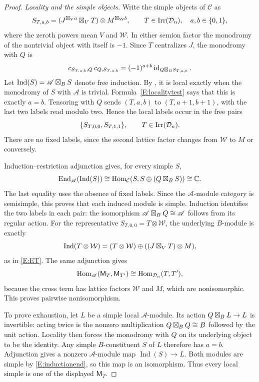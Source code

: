 \documentclass[11pt]{article}
\newcommand{\C}{\mathbb C}\newcommand{\Q}{\mathbb Q}\newcommand{\Z}{\mathbb Z}
\newcommand{\Hom}{\operatorname{Hom}}\newcommand{\id}{\operatorname{id}}
\numberwithin{equation}{section}
\begin{document}
\begin{proof}
\emph{Locality and the simple objects.} Write the simple objects of $\mathcal C$ as
\[
S_{T,a,b}=(J^{\boxtimes_V a}\boxtimes_V T)\otimes M^{\boxtimes_{\mathcal W}b},
\qquad T\in\operatorname{Irr}(\mathcal D_n),\quad a,b\in\{0,1\},
\]
where the zeroth powers mean $V$ and $\mathcal W$. In either semion factor the monodromy of the nontrivial object with itself is $-1$. Since $T$ centralizes $J$, the monodromy with $Q$ is
\begin{equation}\label{E:localitytest}
c_{S_{T,a,b},Q}\,c_{Q,S_{T,a,b}}
=(-1)^{a+b}\id_{Q\bo_B S_{T,a,b}}.
\end{equation}
Let $\operatorname{Ind}(S)=\mathscr A\boxtimes_B S$ denote free induction. By \cite[Proposition~2.65]{E:CKMext}, it is local exactly when the monodromy of $S$ with $\mathscr A$ is trivial. Formula~\eqref{E:localitytest} says that this is exactly $a=b$. Tensoring with $Q$ sends $(T,a,b)$ to $(T,a+1,b+1)$, with the last two labels read modulo two. Hence the local labels occur in the free pairs
\[
\{S_{T,0,0},S_{T,1,1}\},\qquad T\in\operatorname{Irr}(\mathcal D_n).
\]
There are no fixed labels, since the second lattice factor changes from $\mathcal W$ to $M$ or conversely.

Induction--restriction adjunction gives, for every simple $S$,
\begin{equation}\label{E:inductionend}
\End_{\mathscr A}(\operatorname{Ind}(S))
\cong\Hom_{\mathcal C}(S,S\oplus(Q\bo_B S))\cong\C.
\end{equation}
The last equality uses the absence of fixed labels. Since the $\mathscr A$-module category is semisimple, this proves that each induced module is simple. Induction identifies the two labels in each pair: the isomorphism $\mathscr A\boxtimes_B Q\cong\mathscr A$ follows from its regular action. For the representative $S_{T,0,0}=T\otimes\mathcal W$, the underlying $B$-module is exactly
\[
\operatorname{Ind}(T\otimes\mathcal W)
=(T\otimes\mathcal W)\oplus((J\boxtimes_V T)\otimes M),
\]
as in \eqref{E:ET}. The same adjunction gives
\begin{equation}\label{E:inductionhom}
\Hom_{\mathscr A}(\mathsf M_T,\mathsf M_{T'})
\cong\Hom_{\D_n}(T,T'),
\end{equation}
because the cross term has lattice factors $\mathcal W$ and $M$, which are nonisomorphic. This proves pairwise nonisomorphism.

To prove exhaustion, let $L$ be a simple local $\mathscr A$-module. Its action $Q\boxtimes_B L\to L$ is invertible: acting twice is the nonzero multiplication $Q\boxtimes_B Q\cong B$ followed by the unit action. Locality then forces the monodromy with $Q$ on its underlying object to be the identity. Any simple $B$-constituent $S$ of $L$ therefore has $a=b$. Adjunction gives a nonzero $\mathscr A$-module map $\operatorname{Ind}(S)\to L$. Both modules are simple by \eqref{E:inductionend}, so this map is an isomorphism. Thus every local simple is one of the displayed $\mathsf M_T$.


\end{proof}
\end{document}
